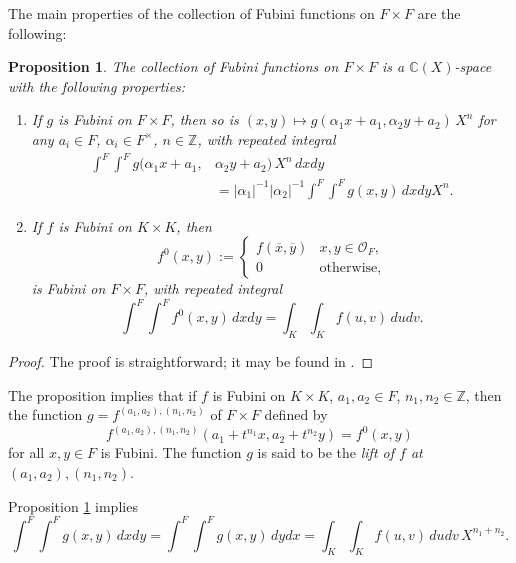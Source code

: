 \documentclass{lmsMODIFIED}
\newtheorem{proposition}[theorem]{Proposition}
\newcommand{\bb}[1]{\mathbb{#1}}
\newcommand{\abs}[1]{\vert#1\vert}
\newcommand{\roi}{\mathcal{O}}
\newcommand{\res}[1]{\overline{#1}}
\newcommand{\al}{\alpha}
\newcommand{\mult}[1]{#1^{\times}}
\begin{document}
The main properties of the collection of Fubini functions on $F\times F$ are the following:
\begin{proposition}\label{proposition_properties_of_fubini_functions}
The collection of Fubini functions on $F\times F$ is a $\bb{C}(X)$-space with the following properties:
\begin{enumerate}
\item If $g$ is Fubini on $F\times F$, then so is $(x,y)\mapsto g(\al_1 x+a_1,\al_2 y+a_2)\,X^n$ for any $a_i\in F$, $\al_i\in\mult{F}$, $n\in\bb{Z}$, with repeated integral \begin{align*}\int^F\int^F g(\al_1 x+a_1,&\al_2 y+a_2)\,X^n\,dxdy\\&=\abs{\al_1}^{-1}\abs{\al_2}^{-1}\int^F\int^F g(x,y)\,dxdy X^n.\end{align*}
\item If $f$ is Fubini on $K\times K$, then \[f^0(x,y):=\begin{cases} f(\res{x},\res{y})&x,y\in\roi_{F},\\0&\mbox{otherwise,}\end{cases}\] is Fubini on $F\times F$, with repeated integral \[\int^F\int^F f^0(x,y)\,dxdy=\int_K\int_K f(u,v)\,dudv.\]
\end{enumerate}
\end{proposition}
\begin{proof}
The proof is straightforward; it may be found in \cite{Morrow2008a}.
\end{proof}

\begin{remark}\label{remark_repeated_integral_of_lifted_function}
The proposition implies that if $f$ is Fubini on $K\times K$, $a_1,a_2\in F$, $n_1,n_2\in\bb{Z}$, then the function $g=f^{(a_1,a_2),(n_1,n_2)}$ of $F\times F$ defined by \[f^{(a_1,a_2),(n_1,n_2)}(a_1+t^{n_1}x,a_2+t^{n_2}y)=f^0(x,y)\] for all $x,y\in F$ is Fubini. The function $g$ is said to be the \emph{lift of $f$ at $(a_1,a_2),(n_1,n_2)$}.

Proposition \ref{proposition_properties_of_fubini_functions} implies \[\int^F\int^F g(x,y)\,dxdy=\int^F\int^F g(x,y)\,dydx=\int_K\int_K f(u,v)\,dudv\,X^{n_1+n_2}.\]
\end{remark}

\end{document}
